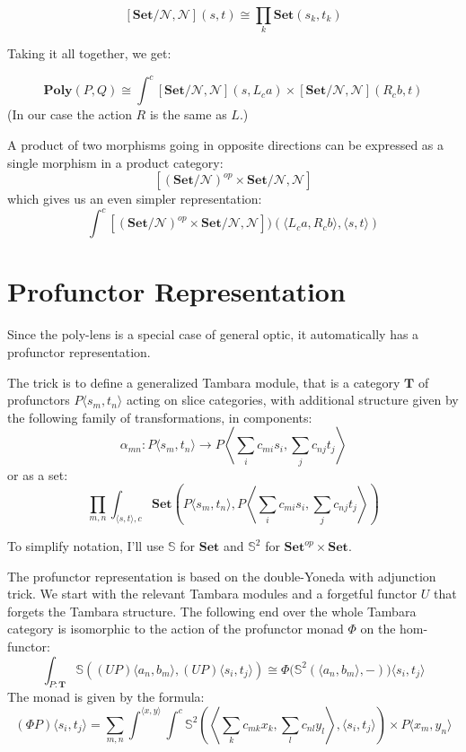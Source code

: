 \documentclass[11pt]{amsart}
\begin{document}
\[ [ \mathbf{Set}/\mathcal{N}, \mathcal{N}] (s, t) \cong \prod_k  \mathbf{Set} \left(s_k, t_k\right) \]

Taking it all together, we get:

\[ \mathbf{Poly}(P, Q) \cong \int^{c}   [ \mathbf{Set}/\mathcal{N}, \mathcal{N}]  \left(s, L_c a\right)  \times  [ \mathbf{Set}/\mathcal{N}, \mathcal{N}]  \left(R_c b, t\right) \]
(In our case the action $R$ is the same as $L$.)

A product of two morphisms going in opposite directions can be expressed as a single morphism in a product category:
\[ [(\mathbf{Set}/\mathcal{N})^{op}\times \mathbf{Set}/\mathcal{N}, \mathcal{N}] \]
 which gives us an even simpler representation:
\[  \int^c [(\mathbf{Set}/\mathcal{N})^{op}\times \mathbf{Set}/\mathcal{N}, \mathcal{N}] ) \left(\langle   L_c a, R_c b \rangle, \langle s, t \rangle \right)\]

 
\section{Profunctor Representation}

Since the poly-lens is a special case of general optic, it automatically has a profunctor representation.

The trick is to define a generalized Tambara module, that is a category $\mathbf{T}$ of profunctors $P\langle s_m, t_n \rangle$ acting on slice categories, with additional structure given by the following family of transformations, in components:
\[\alpha_{m n} \colon P\langle s_m, t_n \rangle \to P \left \langle \sum_i c_{m i}  s_i, \sum_j c_{n j} t_j \right \rangle \]
or as a set:
\[ \prod_{m, n} \int_{ \langle s, t \rangle, c} \mathbf{Set} \left(P\langle s_m, t_n \rangle, P \left \langle \sum_i c_{m i}  s_i, \sum_j c_{n j} t_j \right \rangle \right) \]

To simplify notation, I'll use $\mathbb{S}$ for $\mathbf{Set}$ and $\mathbb{S}^2$ for $\mathbf{Set}^{op} \times \mathbf{Set}$.

The profunctor representation is based on the double-Yoneda with adjunction trick. We start with the relevant Tambara modules and a forgetful functor $U$ that forgets the Tambara structure. The following end over the whole Tambara category is isomorphic to the action of the profunctor monad $\Phi$ on the hom-functor:
\[ \int_{P \colon \mathbf{T}} \mathbb{S}\left ( (U P)\langle a_n, b_m \rangle, (U P) \langle s_i, t_j \rangle \right) \cong \Phi \big( \mathbb{S}^2(\langle a_n, b_m \rangle, -) \big)  \langle s_i, t_j \rangle \]
The monad is given by the formula:
\[ (\Phi P) \langle s_i, t_j \rangle = \sum_{m, n} \int^{\langle x, y \rangle} \int^{c}  
    \mathbb{S}^2
      \left(\left \langle \sum_k c_{m k}  x_k
    , \sum_l c_{n l} y_l \right \rangle,  
        \langle s_i, t_j \rangle \right)
     \times  P\langle x_m, y_n \rangle\]
\end{document}
